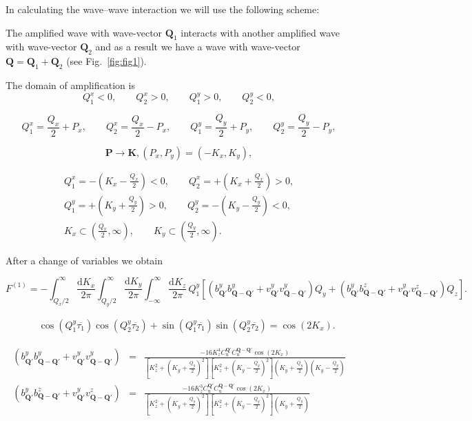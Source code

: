\documentclass[prb,singlecolumn]{revtex4}
\begin{document}
In calculating the wave--wave interaction we will use the following scheme:

The amplified wave with wave-vector $\mathbf{Q}_1$ interacts with another amplified wave with wave-vector $\mathbf{Q}_2$ and as a result we have a wave with wave-vector $\mathbf{Q}=\mathbf{Q}_1+\mathbf{Q}_2$ (see Fig.~\ref{fig:fig1}).

The domain of amplification is
$$ Q_1^x < 0,\qquad Q_2^x > 0,\qquad Q_1^y > 0,\qquad Q_2^y < 0,$$

$$ Q_1^x = \frac{Q_x}2 + P_x,\qquad Q_2^x = \frac{Q_x}2 - P_x,\qquad Q_1^y = \frac{Q_y}2 + P_y,\qquad Q_2^y = \frac{Q_y}2 - P_y, $$

$$\mathbf{P} \rightarrow \mathbf{K} , (P_x,P_y)=(-K_x,K_y), $$

\begin{eqnarray}
Q_1^x = -\left( K_x - \frac{Q_x}2  \right) < 0,\qquad Q_2^x = +\left( K_x + \frac{Q_x}2  \right) > 0, \\
Q_1^y = +\left( K_y + \frac{Q_y}2  \right) > 0,\qquad Q_2^y = -\left( K_y - \frac{Q_y}2  \right) < 0, \\
K_x \subset \left(\frac{Q_x}2,\infty\right), \qquad K_y \subset \left(\frac{Q_y}2,\infty\right).
\end{eqnarray}

After a change of variables we obtain

\begin{equation}
\label{I_initial}
 F^{(1)}=-\int_{Q_x/2}^\infty \frac{\mathrm{d}K_x}{2\pi} \int_{Q_y/2}^\infty \frac{\mathrm{d}K_y}{2\pi} \int_{-\infty}^\infty \frac{\mathrm{d}K_z}{2\pi} \, Q_1^y \left[(b_{\mathbf{Q}'}^yb_{\mathbf{Q}-\mathbf{Q}'}^y + v_{\mathbf{Q}'}^yv_{\mathbf{Q}-\mathbf{Q}'}^y)Q_y + (b_{\mathbf{Q}'}^yb_{\mathbf{Q}-\mathbf{Q}'}^z + v_{\mathbf{Q}'}^yv_{\mathbf{Q}-\mathbf{Q}'}^z)Q_z\right].
\end{equation}


\begin{eqnarray*}
&&\cos\left(Q^y_1\overline{\tau_1}\right)\cos\left(Q^y_2\overline{\tau_2}\right) + \sin\left(Q^y_1\overline{\tau_1}\right)\sin\left(Q^y_2\overline{\tau_2}\right) = \cos(2K_x).
\end{eqnarray*}


\begin{eqnarray}
 (b_{\mathbf{Q}'}^yb_{\mathbf{Q}-\mathbf{Q}'}^y + v_{\mathbf{Q}'}^yv_{\mathbf{Q}-\mathbf{Q}'}^y)&=& \frac{-16K_z^4 C_\mathrm{u}^{\mathbf{Q}'}C_\mathrm{u}^{\mathbf{Q-Q}'} \cos(2K_x)  }
  { \left[K_z^2 + \left(K_y+\frac{Q_y}2 \right)^2\right] \left[K_z^2 + \left(K_y - \frac{Q_y}2 \right)^2\right]\left(K_y +\frac{Q_y}2 \right) \left(K_y - \frac{Q_y}2 \right)}  \\
 (b_{\mathbf{Q}'}^yb_{\mathbf{Q}-\mathbf{Q}'}^z + v_{\mathbf{Q}'}^yv_{\mathbf{Q}-\mathbf{Q}'}^z)&=& \frac{-16K_z^3 C_\mathrm{u}^{\mathbf{Q}'}C_\mathrm{u}^{\mathbf{Q-Q}'} \cos(2K_x)  }
  { \left[K_z^2 + \left(K_y+\frac{Q_y}2 \right)^2\right] \left[K_z^2 + \left(K_y - \frac{Q_y}2 \right)^2\right]\left(K_y +\frac{Q_y}2 \right) }  \\
\end{eqnarray}
\end{document}
